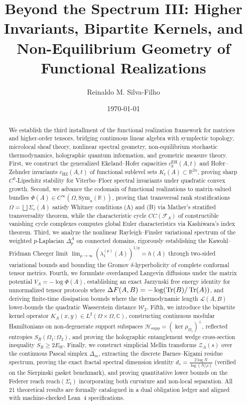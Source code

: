 \documentclass[11pt,a4paper,reqno]{amsart}
\title[Beyond the Spectrum III]{Beyond the Spectrum III: Higher Invariants, Bipartite Kernels, and Non-Equilibrium Geometry of Functional Realizations}
\author{Reinaldo M. Silva-Filho}
\date{\today}
\theoremstyle{definition}
\theoremstyle{remark}
\numberwithin{equation}{section}
\begin{document}
\begin{abstract}
We establish the third installment of the functional realization framework for matrices and higher-order tensors, bridging continuous linear algebra with symplectic topology, microlocal sheaf theory, nonlinear spectral geometry, non-equilibrium stochastic thermodynamics, holographic quantum information, and geometric measure theory. 
First, we construct the generalized Ekeland--Hofer capacities $c_k^{\mathrm{EH}}(A, t)$ and Hofer--Zehnder invariants $c_{\mathrm{HZ}}(A, t)$ of functional sublevel sets $K_t(A) \subset \mathbb{R}^{2n}$, proving sharp $C^0$-Lipschitz stability for Viterbo--Floer spectral invariants under quadratic convex growth. 
Second, we advance the codomain of functional realizations to matrix-valued bundles $\Phi(A) \in C^\infty(\Omega, \mathrm{Sym}_n(\mathbb{R}))$, proving that transversal rank stratifications $\Omega = \bigsqcup \Sigma_r(A)$ satisfy Whitney conditions (A) and (B) via Mather's stratified transversality theorem, while the characteristic cycle $CC(\mathcal{F}_A)$ of constructible vanishing cycle complexes computes global Euler characteristics via Kashiwara's index theorem. 
Third, we analyze the nonlinear Rayleigh--Finsler variational spectrum of the weighted $p$-Laplacian $\Delta_p^A$ on connected domains, rigorously establishing the Kawohl--Fridman Cheeger limit $\lim_{p \to \infty} (\lambda_1^{(p)}(A))^{1/p} = h(A)$ through two-sided variational bounds and bounding the Gromov $\delta$-hyperbolicity of complete conformal tensor metrics. 
Fourth, we formulate overdamped Langevin diffusions under the matrix potential $V_A = -\log \Phi(A)$, establishing an exact Jarzynski free energy identity for unnormalized tensor protocols where $\Delta F(A, B) = -\log(\Tr(B)/\Tr(A))$, and deriving finite-time dissipation bounds where the thermodynamic length $\mathcal{L}(A, B)$ lower-bounds the quadratic Wasserstein distance $\mathcal{W}_2$. 
Fifth, we introduce the bipartite kernel operator $K_A(x, y) \in L^2(\Omega \times \Omega, \mathbb{C})$, constructing continuous modular Hamiltonians on non-degenerate support subspaces $\mathcal{H}_{\mathrm{supp}} = (\ker \rho_{\Omega_1})^\perp$, reflected entropies $S_R(\Omega_1 : \Omega_2)$, and proving the holographic entanglement wedge cross-section inequality $S_R \ge 2 E_W$. 
Finally, we construct simplicial Mellin transforms $\mathcal{Z}_A(s)$ over the continuous Pascal simplex $\Delta_m$, extracting the discrete Barnes--Kigami residue spectrum, proving the exact fractal spectral dimension identity $d_s = \frac{2\log N}{\log(N/\rho)}$ (verified on the Sierpinski gasket benchmark), and proving quantitative lower bounds on the Federer reach $\mathrm{reach}(\Sigma_t)$ incorporating both curvature and non-local separation. 
All 21 theoretical results are formally catalogued in a dual obligation ledger and aligned with machine-checked Lean~4 specifications.
\end{abstract}
\end{document}
